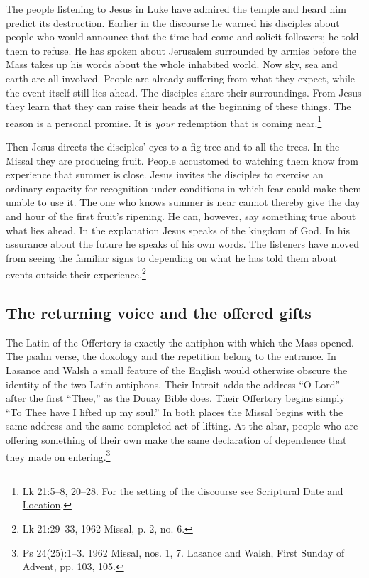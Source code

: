 The people listening to Jesus in Luke have admired the temple and heard him predict its destruction. Earlier in the discourse he warned his disciples about people who would announce that the time had come and solicit followers; he told them to refuse. He has spoken about Jerusalem surrounded by armies before the Mass takes up his words about the whole inhabited world. Now sky, sea and earth are all involved. People are already suffering from what they expect, while the event itself still lies ahead. The disciples share their surroundings. From Jesus they learn that they can raise their heads at the beginning of these things. The reason is a personal promise. It is \emph{your} redemption that is coming near.\footnote{Lk 21:5--8, 20--28. For the setting of the discourse see \hyperref[sec:date-location]{Scriptural Date and Location}.}

Then Jesus directs the disciples' eyes to a fig tree and to all the trees. In the Missal they are producing fruit. People accustomed to watching them know from experience that summer is close. Jesus invites the disciples to exercise an ordinary capacity for recognition under conditions in which fear could make them unable to use it. The one who knows summer is near cannot thereby give the day and hour of the first fruit's ripening. He can, however, say something true about what lies ahead. In the explanation Jesus speaks of the kingdom of God. In his assurance about the future he speaks of his own words. The listeners have moved from seeing the familiar signs to depending on what he has told them about events outside their experience.\footnote{Lk 21:29--33, 1962 Missal, p. 2, no. 6.}

\subsection{The returning voice and the offered gifts}

The Latin of the Offertory is exactly the antiphon with which the Mass opened. The psalm verse, the doxology and the repetition belong to the entrance. In Lasance and Walsh a small feature of the English would otherwise obscure the identity of the two Latin antiphons. Their Introit adds the address ``O Lord'' after the first ``Thee,'' as the Douay Bible does. Their Offertory begins simply ``To Thee have I lifted up my soul.'' In both places the Missal begins with the same address and the same completed act of lifting. At the altar, people who are offering something of their own make the same declaration of dependence that they made on entering.\footnote{Ps 24(25):1--3. 1962 Missal, nos. 1, 7. Lasance and Walsh, First Sunday of Advent, pp. 103, 105.}

